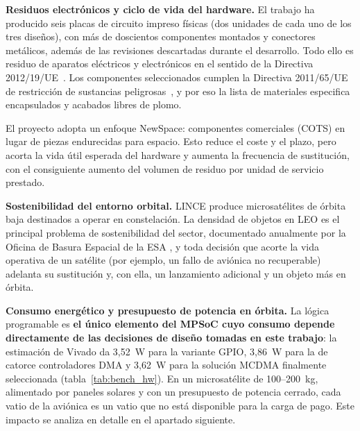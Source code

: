 {\textbf{Residuos electrónicos y ciclo de vida del hardware.} El trabajo ha producido seis placas de
circuito impreso físicas (dos unidades de cada uno de los tres diseños), con más de doscientos
componentes montados y conectores metálicos, además de las revisiones descartadas durante el
desarrollo. Todo ello es residuo de aparatos eléctricos y electrónicos en el sentido de la Directiva
2012/19/UE~\cite{ue2012weee}. Los componentes seleccionados cumplen la Directiva 2011/65/UE de
restricción de sustancias peligrosas~\cite{ue2011rohs}, y por eso la lista de materiales especifica
encapsulados y acabados libres de plomo.

El proyecto adopta un enfoque NewSpace: componentes comerciales (COTS) en lugar de piezas
endurecidas para espacio. Esto reduce el coste y el plazo, pero acorta la vida útil esperada del
hardware y aumenta la frecuencia de sustitución, con el consiguiente aumento del volumen de residuo
por unidad de servicio prestado.

\textbf{Sostenibilidad del entorno orbital.} LINCE produce microsatélites de órbita baja destinados
a operar en constelación. La densidad de objetos en LEO es el principal problema de sostenibilidad
del sector, documentado anualmente por la Oficina de Basura Espacial de la ESA
\cite{esa_environment_report}, y toda decisión que acorte la vida operativa de un satélite (por
ejemplo, un fallo de aviónica no recuperable) adelanta su sustitución y, con ella, un lanzamiento
adicional y un objeto más en órbita.

\textbf{Consumo energético y presupuesto de potencia en órbita.} La lógica programable es
\textbf{el único elemento del MPSoC cuyo consumo depende directamente de las decisiones de diseño
tomadas en este trabajo}: la estimación de Vivado da 3,52~W para la variante GPIO, 3,86~W para la de
catorce controladores DMA y 3,62~W para la solución MCDMA finalmente seleccionada
(tabla~\ref{tab:bench_hw}). En un microsatélite de 100--200~kg, alimentado por paneles solares y
con un presupuesto de potencia cerrado, cada vatio de la aviónica es un vatio que no está
disponible para la carga de pago. Este impacto se analiza en detalle en el apartado siguiente.
}
\vspace{0.3cm}

